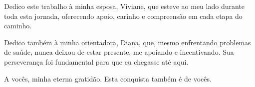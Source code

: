 Dedico este trabalho à minha esposa, Viviane, que esteve ao meu lado durante toda esta jornada, oferecendo apoio, carinho e compreensão em cada etapa do caminho.

Dedico também à minha orientadora, Diana, que, mesmo enfrentando problemas de saúde, nunca deixou de estar presente, me apoiando e incentivando. Sua perseverança foi fundamental para que eu chegasse até aqui.

A vocês, minha eterna gratidão. Esta conquista também é de vocês.